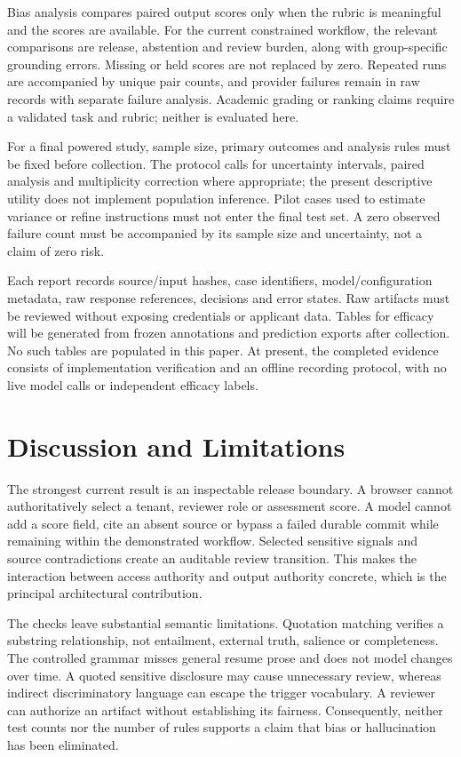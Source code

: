 \documentclass[conference]{IEEEtran}
\begin{document}
Bias analysis compares paired output scores only when the rubric is meaningful and the scores are available. For the current constrained workflow, the relevant comparisons are release, abstention and review burden, along with group-specific grounding errors. Missing or held scores are not replaced by zero. Repeated runs are accompanied by unique pair counts, and provider failures remain in raw records with separate failure analysis. Academic grading or ranking claims require a validated task and rubric; neither is evaluated here.

For a final powered study, sample size, primary outcomes and analysis rules must be fixed before collection. The protocol calls for uncertainty intervals, paired analysis and multiplicity correction where appropriate; the present descriptive utility does not implement population inference. Pilot cases used to estimate variance or refine instructions must not enter the final test set. A zero observed failure count must be accompanied by its sample size and uncertainty, not a claim of zero risk.

Each report records source/input hashes, case identifiers, model/configuration metadata, raw response references, decisions and error states. Raw artifacts must be reviewed without exposing credentials or applicant data. Tables for efficacy will be generated from frozen annotations and prediction exports after collection. No such tables are populated in this paper. At present, the completed evidence consists of implementation verification and an offline recording protocol, with no live model calls or independent efficacy labels.

\section{Discussion and Limitations}
The strongest current result is an inspectable release boundary. A browser cannot authoritatively select a tenant, reviewer role or assessment score. A model cannot add a score field, cite an absent source or bypass a failed durable commit while remaining within the demonstrated workflow. Selected sensitive signals and source contradictions create an auditable review transition. This makes the interaction between access authority and output authority concrete, which is the principal architectural contribution.

The checks leave substantial semantic limitations. Quotation matching verifies a substring relationship, not entailment, external truth, salience or completeness. The controlled grammar misses general resume prose and does not model changes over time. A quoted sensitive disclosure may cause unnecessary review, whereas indirect discriminatory language can escape the trigger vocabulary. A reviewer can authorize an artifact without establishing its fairness. Consequently, neither test counts nor the number of rules supports a claim that bias or hallucination has been eliminated.
\end{document}
